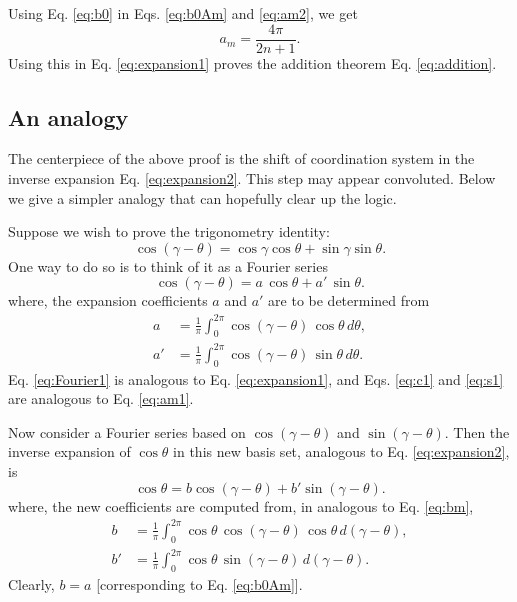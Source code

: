 \documentclass[11pt]{article}
\begin{document}
Using Eq. \eqref{eq:b0} in Eqs. \eqref{eq:b0Am} and \eqref{eq:am2},
we get
\begin{equation}
  a_m = \frac{ 4 \pi } { 2 n + 1 }.
\end{equation}
Using this in Eq. \eqref{eq:expansion1}
proves the addition theorem Eq. \eqref{eq:addition}.




\subsection{An analogy}



The centerpiece of the above proof is the shift of coordination system
in the inverse expansion Eq. \eqref{eq:expansion2}.
This step may appear convoluted.
Below we give a simpler analogy
that can hopefully clear up the logic.

Suppose we wish to prove the trigonometry identity:
\begin{equation}
  \cos(\gamma - \theta)
= \cos\gamma \cos\theta
+ \sin\gamma \sin\theta.
\label{eq:cosab}
\end{equation}
One way to do so is to think of it as a Fourier series
\begin{equation}
  \cos(\gamma - \theta)
=
  a \, \cos\theta
+
  a' \, \sin\theta.
  \label{eq:Fourier1}
\end{equation}
where, the expansion coefficients $a$ and $a'$
are to be determined from
\begin{align}
a &= \frac{1}{\pi} \int_0^{2\pi}
  \cos(\gamma - \theta) \, \cos\theta \, d\theta,
  \label{eq:c1}
\\
a' &= \frac{1}{\pi} \int_0^{2\pi}
  \cos(\gamma - \theta) \, \sin\theta \, d\theta.
  \label{eq:s1}
\end{align}
Eq. \eqref{eq:Fourier1} is analogous to Eq. \eqref{eq:expansion1},
and Eqs. \eqref{eq:c1} and \eqref{eq:s1}
are analogous to Eq. \eqref{eq:am1}.


Now consider a Fourier series based on $\cos(\gamma - \theta)$
and $\sin(\gamma - \theta)$.
Then the inverse expansion of $\cos\theta$
in this new basis set, analogous to Eq. \eqref{eq:expansion2}, is
\begin{equation}
  \cos\theta
  =
  b \cos(\gamma - \theta)
+
  b' \sin(\gamma - \theta).
  \label{eq:Fourier2}
\end{equation}
where,
the new coefficients are computed from,
in analogous to Eq. \eqref{eq:bm},
\begin{align}
b &= \frac{1}{\pi} \int_0^{2\pi}
  \cos\theta \, \cos(\gamma - \theta) \, \cos\theta \, d(\gamma - \theta),
  \label{eq:c2}
\\
b' &= \frac{1}{\pi} \int_0^{2\pi}
  \cos\theta \, \sin(\gamma - \theta) \, d(\gamma - \theta).
  \label{eq:s2}
\end{align}
Clearly, $b = a$ [corresponding to Eq. \eqref{eq:b0Am}].
\end{document}
